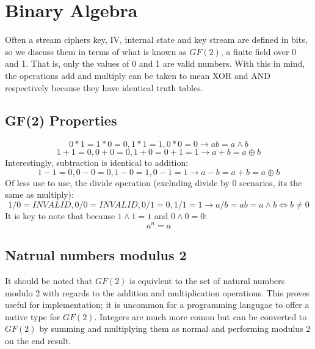 \documentclass{report}
\begin{document}
\section{Binary Algebra}
Often a stream ciphers key, IV, internal state and key stream are defined in bits, so we discuss them in terms of what is known as $\mathit{GF(2)}$, a finite field over 0 and 1. That is, only the values of 0 and 1 are valid numbers. With this in mind, the operations add and multiply can be taken to mean XOR and AND respectively because they have identical truth tables.

\subsection{GF(2) Properties}
\begin{equation} \label{eq:GFtimes}
0*1 = 1*0=0, 1*1=1, 0*0=0 \to ab = a \land b
\end{equation}
\begin{equation} \label{eq:GFadd}
1+1=0, 0+0=0, 1+0=0+1=1 \to a+b = a \oplus b
\end{equation}
Interestingly, subtraction is identical to addition:
\begin{equation} \label{eq:GFminus}
1-1=0, 0-0=0, 1-0=1, 0-1=1 \to a-b = a+b = a \oplus b
\end{equation}
Of less use to use, the divide operation (excluding divide by 0 scenarios, its the same as multiply):
\begin{equation} \label{eq:GFdivide}
1/0=\mathit{INVALID}, 0/0=\mathit{INVALID}, 0/1=0, 1/1=1 \to a/b = ab = a \land b \iff b \neq 0
\end{equation}
It is key to note that because $1\land1=1$ and $0\land0 = 0$:
\begin{equation} \label{eq:GFpowers}
a^n = a
\end{equation}

\subsection{Natrual numbers modulus 2}
It should be noted that $\mathit{GF(2)}$ is equivlent to the set of natural numbers modulo 2 with regards to the addition and multiplication operations. This proves useful for implementation; it is uncommon for a programming langugae to offer a native type for $\mathit{GF(2)}$. Integers are much more comon but can be converted to $\mathit{GF(2)}$ by summing and multiplying them as normal and performing modulus 2 on the end result.
\end{document}
